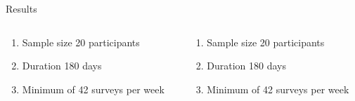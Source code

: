 \documentclass{beamer}
\begin{document}
    \begin{frame}{Results}
        \begin{columns}
            \begin{column}{0.5\textwidth}
                \begin{enumerate}
                    \item Sample size 20 participants
                    \item Duration 180 days
                    \item Minimum of 42 surveys per week
                \end{enumerate}
            \end{column}
            \begin{column}{0.5\textwidth}
                \begin{enumerate}
                    \item Sample size 20 participants
                    \item Duration 180 days
                    \item Minimum of 42 surveys per week
                \end{enumerate}
            \end{column}
        \end{columns}
    \end{frame}
\end{document}
